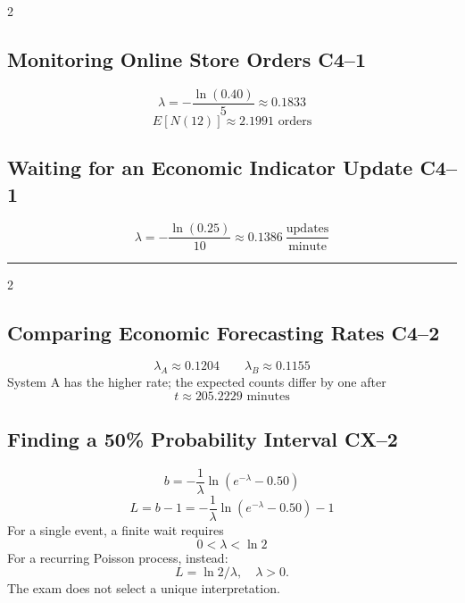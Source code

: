{\begin{multicols}{2}
			\subsection{Monitoring Online Store Orders \hfill C4--1}
			\[
			\lambda=-\frac{\ln(0.40)}5\approx0.1833
			\]\[
			\boxed{E[N(12)]\approx2.1991\text{ orders}}
			\]

			\subsection{Waiting for an Economic Indicator Update \hfill C4--1}
			\[
			\boxed{\lambda=-\frac{\ln(0.25)}{10}
			\approx0.1386\ \frac{\text{updates}}{\text{minute}}}
			\]
			
		\end{multicols}
				\noindent\rule{\textwidth}{0.5pt}
		\begin{multicols}{2}
			
			\subsection{Comparing Economic Forecasting Rates \hfill C4--2}
			\[
			\lambda_A\approx0.1204
			\qquad
			\lambda_B\approx0.1155
			\]
			System A has the higher rate; the expected counts differ by one after
			\[
			\boxed{t\approx205.2229\text{ minutes}}
			\]

			\subsection{Finding a 50\% Probability Interval \hfill CX--2}
			\[
			\boxed{b=-\frac1\lambda
			\ln\left(e^{-\lambda}-0.50\right)}
			\]\[
			\boxed{L=b-1
			=-\frac1\lambda\ln\left(e^{-\lambda}-0.50\right)-1}
			\]
			For a single event, a finite wait requires
			\[
			\boxed{0<\lambda<\ln2}
			\]
		For a recurring Poisson process, instead:
            \[
            \boxed{L=\ln2/\lambda,\quad\lambda>0}.
            \]
            The exam does not select a unique interpretation.
		\end{multicols}
		\vspace{-5mm}
	}
	
	

